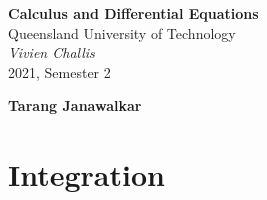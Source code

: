 \documentclass{article}
\date{}
\newcommand{\uniTitle}{Queensland University of Technology}
\newcommand{\className}{Calculus and Differential Equations}
\newcommand{\classTime}{2021, Semester 2}
\newcommand{\classInstructorName}{Vivien Challis}
\newcommand{\authorName}{Tarang Janawalkar}
\begin{document}
\begin{titlepage}
    \vspace*{\fill}
    \begin{center}
        \LARGE
        \textbf{\className}
        \texorpdfstring{\\}{ }
        \uniTitle
        \texorpdfstring{\\}{ }
        \texorpdfstring{\vspace{0.3in}}{ }
        \normalsize\textit{\classInstructorName}
        \texorpdfstring{\\}{ }
        \classTime
    \end{center}
    \begin{center}
        \textbf{\authorName}
    \end{center}
    \vspace*{\fill}
    \doclicenseThis
    \thispagestyle{empty}
\end{titlepage}
\newpage

\tableofcontents
\newpage

\section{Integration}
\end{document}
